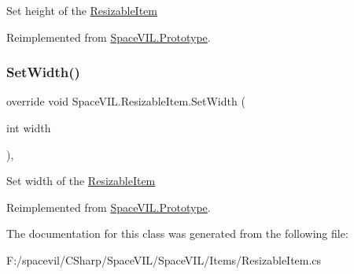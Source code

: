 Set height of the \mbox{\hyperlink{class_space_v_i_l_1_1_resizable_item}{Resizable\+Item}} 



Reimplemented from \mbox{\hyperlink{class_space_v_i_l_1_1_prototype_adc0adcbd1c3800d9525798ba7be5832a}{Space\+V\+I\+L.\+Prototype}}.

\mbox{\label{class_space_v_i_l_1_1_resizable_item_a7f12553e7547d5ef653be8719e9cfee4}} 
\subsubsection{\texorpdfstring{Set\+Width()}{SetWidth()}}
{\footnotesize\ttfamily override void Space\+V\+I\+L.\+Resizable\+Item.\+Set\+Width (\begin{DoxyParamCaption}\item[{int}]{width }\end{DoxyParamCaption})\hspace{0.3cm}{\ttfamily [inline]}, {\ttfamily [virtual]}}



Set width of the \mbox{\hyperlink{class_space_v_i_l_1_1_resizable_item}{Resizable\+Item}} 



Reimplemented from \mbox{\hyperlink{class_space_v_i_l_1_1_prototype_a6a4f1b9581f4d18f1c3a3e287d4b2a2b}{Space\+V\+I\+L.\+Prototype}}.



The documentation for this class was generated from the following file\+:\begin{DoxyCompactItemize}
\item 
F\+:/spacevil/\+C\+Sharp/\+Space\+V\+I\+L/\+Space\+V\+I\+L/\+Items/Resizable\+Item.\+cs\end{DoxyCompactItemize}
